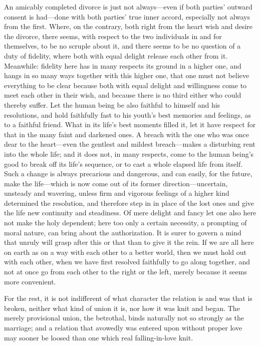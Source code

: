 \documentclass[12pt,a4paper]{book}
\begin{document}
An amicably completed divorce is just not always---even if both parties'
outward consent is had---done with both parties' true inner accord,
especially not always from the first. Where, on the contrary, both right
from the heart wish and desire the divorce, there seems, with respect to
the two individuals in and for themselves, to be no scruple about it, and
there seems to be no question of a duty of fidelity, where both with equal
delight release each other from it. Meanwhile: fidelity here has in many
respects its ground in a higher one, and hangs in so many ways together
with this higher one, that one must not believe everything to be clear
because both with equal delight and willingness come to meet each other in
their wish, and because there is no third either who could thereby suffer.
Let the human being be also faithful to himself and his resolutions, and
hold faithfully fast to his youth's best memories and feelings, as to a
faithful friend. What in its life's best moments filled it, let it have
respect for that in the many faint and darkened ones. A breach with the one
who was once dear to the heart---even the gentlest and mildest breach---makes
a disturbing rent into the whole life; and it does not, in many respects,
come to the human being's good to break off its life's sequence, or to cast
a whole elapsed life from itself. Such a change is always precarious and
dangerous, and can easily, for the future, make the life---which is now come
out of its former direction---uncertain, unsteady and wavering, unless firm
and vigorous feelings of a higher kind determined the resolution, and
therefore step in in place of the lost ones and give the life new
continuity and steadiness. Of mere delight and fancy let one also here not
make the holy dependent; here too only a certain necessity, a prompting of
moral nature, can bring about the authorization. It is surer to govern a
mind that unruly will grasp after this or that than to give it the rein. If
we are all here on earth as on a way with each other to a better world,
then we must hold out with each other, when we have first resolved
faithfully to go along together, and not at once go from each other to the
right or the left, merely because it seems more convenient.

For the rest, it is not indifferent of what character the relation is and
was that is broken, neither what kind of union it is, nor how it was knit
and began. The merely provisional union, the betrothal, binds naturally not
so strongly as the marriage; and a relation that avowedly was entered upon
without proper love may sooner be loosed than one which real
falling-in-love knit.
\end{document}
